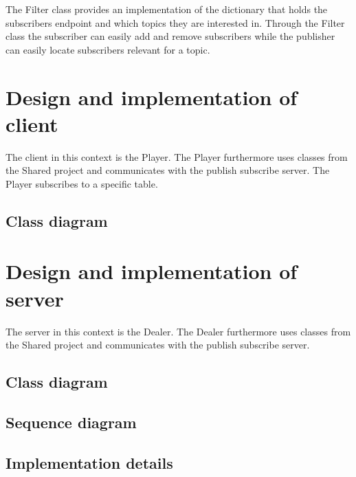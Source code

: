 The Filter class provides an implementation of the dictionary that holds the subscribers endpoint and which topics they are interested in. Through the Filter class the subscriber can easily add and remove subscribers while the publisher can easily locate subscribers relevant for a topic.


\section{Design and implementation of client}
The client in this context is the Player. The Player furthermore uses classes from the Shared project and communicates with the publish subscribe server. The Player subscribes to a specific table.

\subsection{Class diagram}


\section{Design and implementation of server}
The server in this context is the Dealer. The Dealer furthermore uses classes from the Shared project and communicates with the publish subscribe server.

\subsection{Class diagram}


\subsection{Sequence diagram}

\subsection{Implementation details}